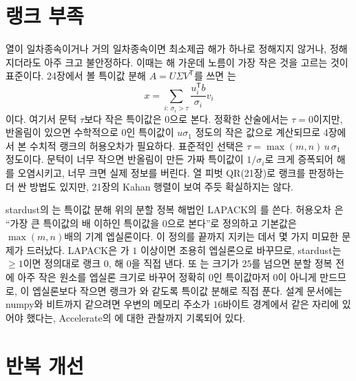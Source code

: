 \section{랭크 부족}
\label{sec:rank-deficient}

열이 일차종속이거나 거의 일차종속이면 최소제곱 해가 하나로 정해지지 않거나, 정해지더라도 아주 크고 불안정하다. 이때는 해 가운데 노름이 가장 작은 것을 고르는 것이 표준이다. 24장에서 볼 특이값 분해 $A=U\Sigma V^{\mathsf T}$를 쓰면 는
\[
x=\sum_{i:\,\sigma_i>\tau}\frac{u_i^{\mathsf T}b}{\sigma_i}v_i
\]
이다. 여기서 문턱 $\tau$보다 작은 특이값은 $0$으로 본다. 정확한 산술에서는 $\tau=0$이지만, 반올림이 있으면 수학적으로 $0$인 특이값이 $u\sigma_1$ 정도의 작은 값으로 계산되므로 4장에서 본 수치적 랭크의 허용오차가 필요하다. 표준적인 선택은 $\tau=\max(m,n)\,u\,\sigma_1$ 정도이다. 문턱이 너무 작으면 반올림이 만든 가짜 특이값이 $1/\sigma_i$로 크게 증폭되어 해를 오염시키고, 너무 크면 실제 정보를 버린다. 열 피벗 QR(21장)로 랭크를 판정하는 더 싼 방법도 있지만, 21장의 Kahan 행렬이 보여 주듯 확실하지는 않다.

\begin{instardust}
stardust의 는 특이값 분해 위의 분할 정복 해법인 LAPACK의 를 쓴다. 허용오차 은 ``가장 큰 특이값의 배 이하인 특이값을 $0$으로 본다''로 정의하고 기본값은 $\max(m,n)$배의 기계 엡실론이다. 이 정의를 끝까지 지키는 데서 몇 가지 미묘한 문제가 드러났다. LAPACK은 가 $1$ 이상이면 조용히 엡실론으로 바꾸므로, stardust는 $\ge1$이면 정의대로 랭크 $0$, 해 $0$을 직접 낸다. 또 는 크기가 $25$를 넘으면 분할 정복 전에 아주 작은 원소를 엡실론 크기로 바꾸어 정확히 $0$인 특이값마저 $0$이 아니게 만드므로, 이 엡실론보다 작으면 랭크가 와 같도록 특이값 분해로 직접 푼다. 설계 문서에는 numpy와 비트까지 같으려면 우변의 메모리 주소가 $16$바이트 경계에서 같은 자리에 있어야 했다는, Accelerate의 에 대한 관찰까지 기록되어 있다.
\end{instardust}

\section{반복 개선}
\label{sec:ls-refinement}

